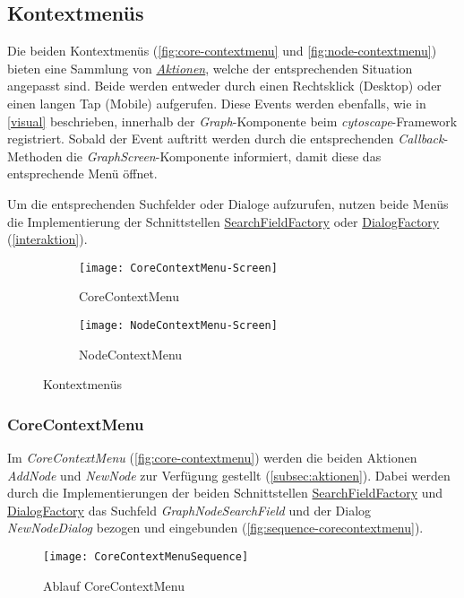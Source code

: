 \subsection{Kontextmenüs}
Die beiden Kontextmenüs (\autoref{fig:core-contextmenu} und \autoref{fig:node-contextmenu}) bieten eine Sammlung von \hyperref[subsec:aktionen]{\textit{Aktionen}}, welche der entsprechenden Situation angepasst sind. Beide werden entweder durch einen Rechtsklick (Desktop) oder einen langen Tap (Mobile) aufgerufen. Diese \gls{Event}s werden ebenfalls, wie in \autoref{visual} beschrieben, innerhalb der \textit{Graph}-Komponente beim \textit{cytoscape}-Framework registriert. Sobald der \gls{Event} auftritt werden durch die entsprechenden \textit{Callback}-Methoden die \textit{GraphScreen}-Komponente informiert, damit diese das entsprechende Menü öffnet.

Um die entsprechenden Suchfelder oder Dialoge aufzurufen, nutzen beide Menüs die Implementierung der Schnittstellen \hyperref[SearchFieldFactory]{SearchFieldFactory} oder \hyperref[DialogFactory]{DialogFactory} (\autoref{interaktion}).

\begin{figure}
\centering
\begin{subfigure}[b]{0.5\textwidth}
    \texttt{[image: CoreContextMenu-Screen]}
    \caption{CoreContextMenu}
    \label{fig:core-contextmenu}
    \end{subfigure}
\begin{subfigure}[b]{0.4\textwidth}
    \texttt{[image: NodeContextMenu-Screen]}
    \caption{NodeContextMenu}
    \label{fig:node-contextmenu}
    \end{subfigure}
    \caption{Kontextmenüs}
\end{figure}


\subsubsection{CoreContextMenu}
Im \textit{CoreContextMenu} (\autoref{fig:core-contextmenu}) werden die beiden Aktionen \textit{AddNode} und \textit{NewNode} zur Verfügung gestellt (\autoref{subsec:aktionen}). Dabei werden durch die Implementierungen der beiden Schnittstellen \hyperref[SearchFieldFactory]{SearchFieldFactory} und \hyperref[DialogFactory]{DialogFactory} das Suchfeld \textit{GraphNodeSearchField} und der Dialog \textit{NewNodeDialog} bezogen und eingebunden (\autoref{fig:sequence-corecontextmenu}).

\begin{figure}[htbp]
\centerline{\texttt{[image: CoreContextMenuSequence]}}
\caption{Ablauf CoreContextMenu}
\label{fig:sequence-corecontextmenu}
\end{figure}


